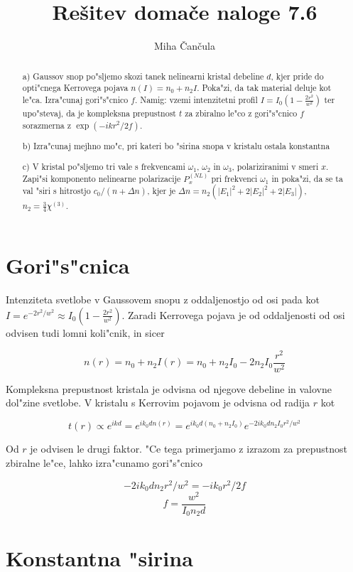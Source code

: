 \documentclass[a4paper,10pt]{article}
\title{Re\v sitev doma\v ce naloge 7.6}
\author{Miha \v Can\v cula}
\begin{document}
\maketitle

\begin{abstract}
a) Gaussov snop po"sljemo skozi tanek nelinearni kristal debeline $d$, kjer pride do opti"cnega Kerrovega pojava $n(I) = n_0 + n_2 I$. Poka"zi, da tak material deluje kot le"ca. Izra"cunaj gori"s"cnico $f$. Namig: vzemi intenzitetni profil $I = I_0(1-\frac{2r^2}{w^2})$ ter upo"stevaj, da je kompleksna prepustnost $t$ za zbiralno le"co z gori"s"cnico $f$ sorazmerna z $\exp(-ikr^2/2f)$. 

b) Izra"cunaj mejhno mo"c, pri kateri bo "sirina snopa v kristalu ostala konstantna

c) V kristal po"sljemo tri vale s frekvencami $\omega_1$, $\omega_2$ in $\omega_3$, polariziranimi v smeri $x$. Zapi"si komponento nelinearne polarizacije $P_{x}^{(NL)}$ pri frekvenci $\omega_1$ in poka"zi, da se ta val "siri s hitrostjo $c_0/(n+\Delta n)$, kjer je $\Delta n = n_2(|E_1|^2 + 2|E_2|^2 + 2|E_3|)$, $n_2 = \frac{3}{4}\chi^{(3)}$. 
\end{abstract}

\section{Gori"s"cnica}

Intenziteta svetlobe v Gaussovem snopu z oddaljenostjo od osi pada kot $I = e^{-2r^2/w^2} \approx I_0(1 - \frac{2r^2}{w^2})$. Zaradi Kerrovega pojava je od oddaljenosti od osi odvisen tudi lomni koli"cnik, in sicer

$$n(r) = n_0 + n_2 I(r) = n_0 + n_2I_0 - 2n_2I_0\frac{r^2}{w^2}$$

Kompleksna prepustnost kristala je odvisna od njegove debeline in valovne dol"zine svetlobe. V kristalu s Kerrovim pojavom je odvisna od radija $r$ kot

$$t(r) \propto e^{ikd} = e^{ik_0d n(r)} = e^{ik_0d(n_0 + n_2I_0)} e^{-2ik_0dn_2I_0 r^2/w^2}$$

Od $r$ je odvisen le drugi faktor. "Ce tega primerjamo z izrazom za prepustnost zbiralne le"ce, lahko izra"cunamo gori"s"cnico

$$-2ik_0dn_2 r^2/w^2 = -ik_0r^2/2f$$
$$f = \frac{w^2}{I_0 n_2 d}$$

\section{Konstantna "sirina}
\end{document}
